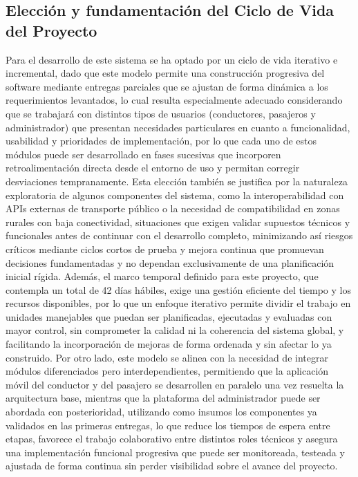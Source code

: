 \documentclass[12pt]{article}
\begin{document}
\subsection{Elección y fundamentación del Ciclo de Vida del Proyecto}
Para el desarrollo de este sistema se ha optado por un ciclo de vida iterativo e incremental, dado que este modelo permite una construcción progresiva del software mediante entregas parciales que se ajustan de forma dinámica a los requerimientos levantados, lo cual resulta especialmente adecuado considerando que se trabajará con distintos tipos de usuarios (conductores, pasajeros y administrador) que presentan necesidades particulares en cuanto a funcionalidad, usabilidad y prioridades de implementación, por lo que cada uno de estos módulos puede ser desarrollado en fases sucesivas que incorporen retroalimentación directa desde el entorno de uso y permitan corregir desviaciones tempranamente. Esta elección también se justifica por la naturaleza exploratoria de algunos componentes del sistema, como la interoperabilidad con APIs externas de transporte público o la necesidad de compatibilidad en zonas rurales con baja conectividad, situaciones que exigen validar supuestos técnicos y funcionales antes de continuar con el desarrollo completo, minimizando así riesgos críticos mediante ciclos cortos de prueba y mejora continua que promuevan decisiones fundamentadas y no dependan exclusivamente de una planificación inicial rígida. Además, el marco temporal definido para este proyecto, que contempla un total de 42 días hábiles, exige una gestión eficiente del tiempo y los recursos disponibles, por lo que un enfoque iterativo permite dividir el trabajo en unidades manejables que puedan ser planificadas, ejecutadas y evaluadas con mayor control, sin comprometer la calidad ni la coherencia del sistema global, y facilitando la incorporación de mejoras de forma ordenada y sin afectar lo ya construido. Por otro lado, este modelo se alinea con la necesidad de integrar módulos diferenciados pero interdependientes, permitiendo que la aplicación móvil del conductor y del pasajero se desarrollen en paralelo una vez resuelta la arquitectura base, mientras que la plataforma del administrador puede ser abordada con posterioridad, utilizando como insumos los componentes ya validados en las primeras entregas, lo que reduce los tiempos de espera entre etapas, favorece el trabajo colaborativo entre distintos roles técnicos y asegura una implementación funcional progresiva que puede ser monitoreada, testeada y ajustada de forma continua sin perder visibilidad sobre el avance del proyecto.
\end{document}
